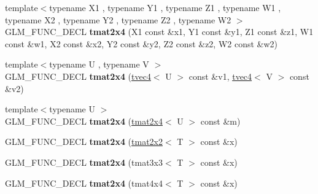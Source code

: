 \begin{DoxyCompactItemize}
\item 
\hypertarget{structglm_1_1detail_1_1tmat2x4_a77fe9faca8e8861e4869fa09b0b19d54}{{\footnotesize template$<$typename X1 , typename Y1 , typename Z1 , typename W1 , typename X2 , typename Y2 , typename Z2 , typename W2 $>$ }\\\-G\-L\-M\-\_\-\-F\-U\-N\-C\-\_\-\-D\-E\-C\-L {\bfseries tmat2x4} (\-X1 const \&x1, \-Y1 const \&y1, \-Z1 const \&z1, \-W1 const \&w1, \-X2 const \&x2, \-Y2 const \&y2, \-Z2 const \&z2, \-W2 const \&w2)}\label{structglm_1_1detail_1_1tmat2x4_a77fe9faca8e8861e4869fa09b0b19d54}

\item 
\hypertarget{structglm_1_1detail_1_1tmat2x4_a69bd317a5f087319096249d9639442f1}{{\footnotesize template$<$typename U , typename V $>$ }\\\-G\-L\-M\-\_\-\-F\-U\-N\-C\-\_\-\-D\-E\-C\-L {\bfseries tmat2x4} (\hyperlink{structglm_1_1detail_1_1tvec4}{tvec4}$<$ \-U $>$ const \&v1, \hyperlink{structglm_1_1detail_1_1tvec4}{tvec4}$<$ \-V $>$ const \&v2)}\label{structglm_1_1detail_1_1tmat2x4_a69bd317a5f087319096249d9639442f1}

\item 
\hypertarget{structglm_1_1detail_1_1tmat2x4_a27118e9abda40f323b34e154177f7d00}{{\footnotesize template$<$typename U $>$ }\\\-G\-L\-M\-\_\-\-F\-U\-N\-C\-\_\-\-D\-E\-C\-L {\bfseries tmat2x4} (\hyperlink{structglm_1_1detail_1_1tmat2x4}{tmat2x4}$<$ \-U $>$ const \&m)}\label{structglm_1_1detail_1_1tmat2x4_a27118e9abda40f323b34e154177f7d00}

\item 
\hypertarget{structglm_1_1detail_1_1tmat2x4_a99a7f8713b447d8bdb2da21b045a75fe}{\-G\-L\-M\-\_\-\-F\-U\-N\-C\-\_\-\-D\-E\-C\-L {\bfseries tmat2x4} (\hyperlink{structglm_1_1detail_1_1tmat2x2}{tmat2x2}$<$ \-T $>$ const \&x)}\label{structglm_1_1detail_1_1tmat2x4_a99a7f8713b447d8bdb2da21b045a75fe}

\item 
\hypertarget{structglm_1_1detail_1_1tmat2x4_a025ab21514405a293a5f692d05c58593}{\-G\-L\-M\-\_\-\-F\-U\-N\-C\-\_\-\-D\-E\-C\-L {\bfseries tmat2x4} (tmat3x3$<$ \-T $>$ const \&x)}\label{structglm_1_1detail_1_1tmat2x4_a025ab21514405a293a5f692d05c58593}

\item 
\hypertarget{structglm_1_1detail_1_1tmat2x4_ab0419a837a3726e8c597db720b92b9a6}{\-G\-L\-M\-\_\-\-F\-U\-N\-C\-\_\-\-D\-E\-C\-L {\bfseries tmat2x4} (tmat4x4$<$ \-T $>$ const \&x)}\label{structglm_1_1detail_1_1tmat2x4_ab0419a837a3726e8c597db720b92b9a6}


\end{DoxyCompactItemize}

